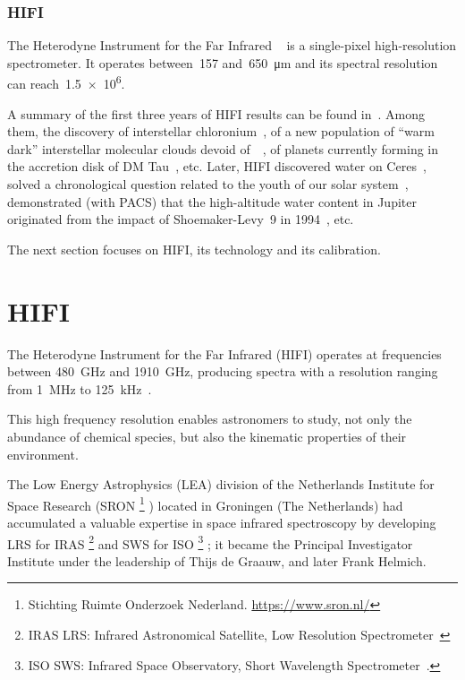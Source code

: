 \subsubsection{HIFI}
The Heterodyne Instrument for the Far Infrared%
~\parencite{AA_537_A17}
is a single-pixel high-resolution spectrometer.
It operates between~\num{157} and~\SI{650}{\micro\meter} and its spectral resolution can reach~\num{1.5e6}.

A summary of the first three years of HIFI results can be found in~\textcite{vandertak2012first}.
Among them,
the discovery of interstellar chloronium~\parencite{lis2010herschel},
of a new population of ``warm dark'' interstellar molecular clouds devoid of~~\parencite{langer2010c+},
of planets currently forming in the accretion disk of DM Tau~\parencite{bergin2010sensitive}, etc.
Later, HIFI discovered water on Ceres~\parencite{kuppers2014localized},
solved a chronological question related to the youth of our solar system~\parencite{ceccarelli2014herschel},
demonstrated (with PACS) that the high-altitude water content in Jupiter originated from the impact of Shoemaker-Levy~9 in 1994~\parencite{cavalie2013spatial}, etc.

The next section focuses on HIFI, its technology and its calibration.



\section{HIFI}

The Heterodyne Instrument for the Far Infrared (HIFI) operates at frequencies between \SI{480}{\giga\hertz} and \SI{1910}{\giga\hertz},
producing spectra with a resolution ranging from \SI{1}{\mega\hertz} to \SI{125}{\kilo\hertz}~\parencite{AA_518_L6}.

This high frequency resolution enables astronomers to study, not only the abundance of chemical species, but also the kinematic properties of their environment.

The Low Energy Astrophysics (LEA) division of the Netherlands Institute for Space Research (SRON%
\footnote{
    Stichting Ruimte Onderzoek Nederland.
    \url{https://www.sron.nl/}
}%
) located in Groningen (The Netherlands)
had accumulated a valuable expertise in space infrared spectroscopy by developing
LRS for IRAS%
\footnote{
    IRAS LRS: Infrared Astronomical Satellite, Low Resolution Spectrometer~\parencite{neugebauer1984infrared}
}
and SWS for ISO%
\footnote{
   ISO SWS: Infrared Space Observatory, Short Wavelength Spectrometer~\parencite{isoHandbook5}.
}%
;
it became the Principal Investigator Institute under the leadership of Thijs de Graauw, and later Frank Helmich.


